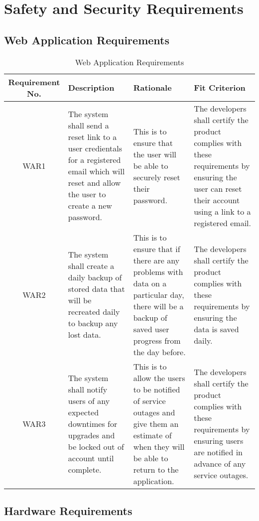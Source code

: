\documentclass{article}
\begin{document}
\section{Safety and Security Requirements}

\subsection{Web Application Requirements}

\begin{longtable}{| c | p{4cm}| p{4cm}| p{4cm}|}
    \caption{Web Application Requirements} \\
    \hline
    \textbf{Requirement No.} & \textbf{Description} &\textbf{Rationale} &\textbf{Fit Criterion}\\
    \hline
    WAR1 & The system shall send a reset link to a user credientals for a registered email which will reset and allow the user to create a new password. & This is to ensure that the user will be able to securely reset their password. & The developers shall certify the product complies with these requirements by ensuring the user can reset their account using a link to a registered email. \\
    \hline
    WAR2 & The system shall create a daily backup of stored data that will be recreated daily to backup any lost data. & This is to ensure that if there are any problems with data on a particular day, there will be a backup of saved user progress from the day before. & The developers shall certify the product complies with these requirements by ensuring the data is saved daily.\\
    \hline
    WAR3 & The system shall notify users of any expected downtimes for upgrades and be locked out of account until complete. & This is to allow the users to be notified of service outages and give them an estimate of when they will be able to return to the application. & The developers shall certify the product complies with these requirements by ensuring users are notified in advance of any service outages.\\
    \bottomrule
\end{longtable}

\subsection{Hardware Requirements}
\end{document}
